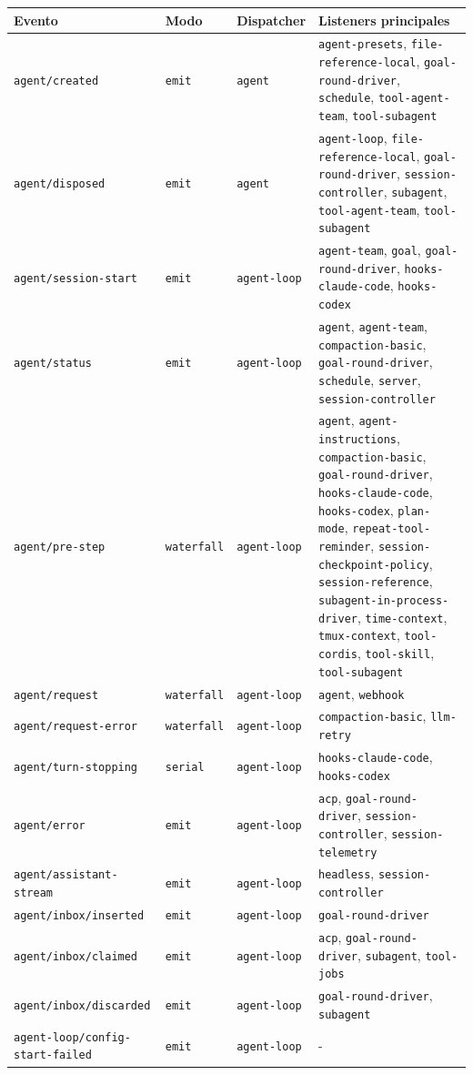 \documentclass[11pt,a4paper]{article}
\begin{document}
\begin{center}
\begin{tabular}{@{}llll@{}}
\toprule
Evento & Modo & Dispatcher & Listeners principales \\
\midrule
\texttt{agent/created} & \texttt{emit} & \texttt{agent} & \texttt{agent-presets}, \texttt{file-reference-local}, \texttt{goal-round-driver}, \texttt{schedule}, \texttt{tool-agent-team}, \texttt{tool-subagent} \\
\texttt{agent/disposed} & \texttt{emit} & \texttt{agent} & \texttt{agent-loop}, \texttt{file-reference-local}, \texttt{goal-round-driver}, \texttt{session-controller}, \texttt{subagent}, \texttt{tool-agent-team}, \texttt{tool-subagent} \\
\texttt{agent/session-start} & \texttt{emit} & \texttt{agent-loop} & \texttt{agent-team}, \texttt{goal}, \texttt{goal-round-driver}, \texttt{hooks-claude-code}, \texttt{hooks-codex} \\
\texttt{agent/status} & \texttt{emit} & \texttt{agent-loop} & \texttt{agent}, \texttt{agent-team}, \texttt{compaction-basic}, \texttt{goal-round-driver}, \texttt{schedule}, \texttt{server}, \texttt{session-controller} \\
\texttt{agent/pre-step} & \texttt{waterfall} & \texttt{agent-loop} & \texttt{agent}, \texttt{agent-instructions}, \texttt{compaction-basic}, \texttt{goal-round-driver}, \texttt{hooks-claude-code}, \texttt{hooks-codex}, \texttt{plan-mode}, \texttt{repeat-tool-reminder}, \texttt{session-checkpoint-policy}, \texttt{session-reference}, \texttt{subagent-in-process-driver}, \texttt{time-context}, \texttt{tmux-context}, \texttt{tool-cordis}, \texttt{tool-skill}, \texttt{tool-subagent} \\
\texttt{agent/request} & \texttt{waterfall} & \texttt{agent-loop} & \texttt{agent}, \texttt{webhook} \\
\texttt{agent/request-error} & \texttt{waterfall} & \texttt{agent-loop} & \texttt{compaction-basic}, \texttt{llm-retry} \\
\texttt{agent/turn-stopping} & \texttt{serial} & \texttt{agent-loop} & \texttt{hooks-claude-code}, \texttt{hooks-codex} \\
\texttt{agent/error} & \texttt{emit} & \texttt{agent-loop} & \texttt{acp}, \texttt{goal-round-driver}, \texttt{session-controller}, \texttt{session-telemetry} \\
\texttt{agent/assistant-stream} & \texttt{emit} & \texttt{agent-loop} & \texttt{headless}, \texttt{session-controller} \\
\texttt{agent/inbox/inserted} & \texttt{emit} & \texttt{agent-loop} & \texttt{goal-round-driver} \\
\texttt{agent/inbox/claimed} & \texttt{emit} & \texttt{agent-loop} & \texttt{acp}, \texttt{goal-round-driver}, \texttt{subagent}, \texttt{tool-jobs} \\
\texttt{agent/inbox/discarded} & \texttt{emit} & \texttt{agent-loop} & \texttt{goal-round-driver}, \texttt{subagent} \\
\texttt{agent-loop/config-start-failed} & \texttt{emit} & \texttt{agent-loop} & - \\
\bottomrule
\end{tabular}
\end{center}
\end{document}
